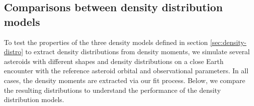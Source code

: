 \documentclass[fleqn,usenatbib]{mnras}
\begin{document}
\subsection{Comparisons between density distribution models}
\label{sec:density-compare}

To test the properties of the three density models defined in section \ref{sec:density-distro} to extract density distributions from density moments, we simulate several asteroids with different shapes and density distributions on a close Earth encounter with the reference asteroid orbital and observational parameters. In all cases, the density moments are extracted via our fit process. Below, we compare the resulting distributions to understand the performance of the density distribution models.





\end{document}
